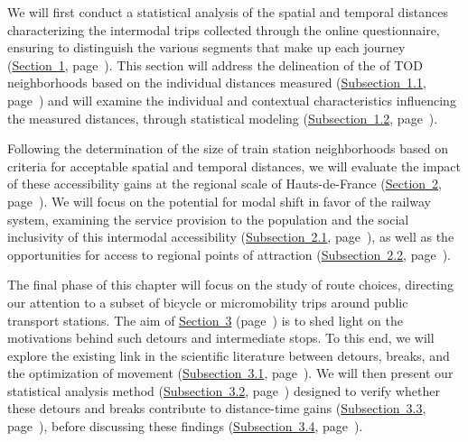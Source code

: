 \begin{refsegment}
We will first conduct a statistical analysis of the spatial and temporal distances characterizing the intermodal trips collected through the online questionnaire, ensuring to distinguish the various segments that make up each \gls{journey} (\hyperref[chap5:aire-secondaire-quartier-gare]{Section~1}, page~\pageref{chap5:aire-secondaire-quartier-gare}). This section will address the delineation of the  of \acrshort{TOD} neighborhoods based on the individual distances measured (\hyperref[chap5:aire-cyclable-micromobilite]{Subsection~1.1}, page~\pageref{chap5:aire-cyclable-micromobilite}) and will examine the individual and contextual characteristics influencing the measured distances, through statistical modeling (\hyperref[chap5:regression-distances]{Subsection~1.2}, page~\pageref{chap5:regression-distances}).%

Following the determination of the size of train station neighborhoods based on criteria for acceptable spatial and temporal distances, we will evaluate the impact of these accessibility gains at the regional scale of Hauts-de-France (\hyperref[chap5:accessibilite-intermodale-extension-aire-influence]{Section~2}, page~\pageref{chap5:accessibilite-intermodale-extension-aire-influence}). We will focus on the potential for modal shift in favor of the railway system, examining the service provision to the population and the social inclusivity of this intermodal accessibility (\hyperref[chap5:couverture-population]{Subsection~2.1}, page~\pageref{chap5:couverture-population}), as well as the opportunities for access to regional points of attraction (\hyperref[chap5:couverture-population]{Subsection~2.2}, page~\pageref{chap5:accessibilite-emplois}).%

The final phase of this chapter will focus on the study of route choices, directing our attention to a subset of bicycle or micromobility trips around public transport stations. The aim of \hyperref[chap5:detours-pauses-optimisation]{Section~3} (page~\pageref{chap5:detours-pauses-optimisation}) is to shed light on the motivations behind such detours and intermediate stops. To this end, we will explore the existing link in the scientific literature between detours, breaks, and the optimization of movement (\hyperref[chap5:enjeux-detours-pauses]{Subsection~3.1}, page~\pageref{chap5:enjeux-detours-pauses}). We will then present our statistical analysis method (\hyperref[chap5:methodes-statistiques]{Subsection~3.2}, page~\pageref{chap5:methodes-statistiques}) designed to verify whether these detours and breaks contribute to distance-time gains (\hyperref[chap5:strategies-optimisation]{Subsection~3.3}, page~\pageref{chap5:strategies-optimisation}), before discussing these findings (\hyperref[chap5:discussion-detours-pauses-optimisation]{Subsection~3.4}, page~\pageref{chap5:discussion-detours-pauses-optimisation}).%


\end{refsegment}
